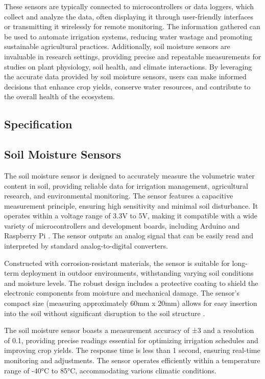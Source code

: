 These sensors are typically connected to microcontrollers or data loggers, which collect and analyze the data, often displaying it through user-friendly interfaces or transmitting it wirelessly for remote monitoring. The information gathered can be used to automate irrigation systems, reducing water wastage and promoting sustainable agricultural practices. Additionally, soil moisture sensors are invaluable in research settings, providing precise and repeatable measurements for studies on plant physiology, soil health, and climate interactions. By leveraging the accurate data provided by soil moisture sensors, users can make informed decisions that enhance crop yields, conserve water resources, and contribute to the overall health of the ecosystem.



\subsection{Specification}
\subsection{Soil Moisture Sensors}

The soil moisture sensor is designed to accurately measure the volumetric water content in soil, providing reliable data for irrigation management, agricultural research, and environmental monitoring. The sensor features a capacitive measurement principle, ensuring high sensitivity and minimal soil disturbance. It operates within a voltage range of 3.3V to 5V, making it compatible with a wide variety of microcontrollers and development boards, including Arduino and Raspberry Pi \cite{Maheswaran:2024}. The sensor outputs an analog signal that can be easily read and interpreted by standard analog-to-digital converters.

Constructed with corrosion-resistant materials, the sensor is suitable for long-term deployment in outdoor environments, withstanding varying soil conditions and moisture levels. The robust design includes a protective coating to shield the electronic components from moisture and mechanical damage. The sensor's compact size (measuring approximately 60mm x 20mm) allows for easy insertion into the soil without significant disruption to the soil structure \cite{Deepthi:2024}.

The soil moisture sensor boasts a measurement accuracy of ±3 and a resolution of 0.1, providing precise readings essential for optimizing irrigation schedules and improving crop yields. The response time is less than 1 second, ensuring real-time monitoring and adjustments. The sensor operates efficiently within a temperature range of -40°C to 85°C, accommodating various climatic conditions\cite{Rama:2021}.

